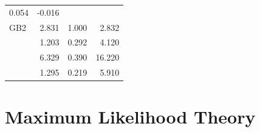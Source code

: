 \documentclass[]{book}
\begin{document}
\begin{longtable}[]{@{}lrrr@{}}
\begin{minipage}[t]{0.24\columnwidth}
0.054\strut
\end{minipage} & \begin{minipage}[t]{0.24\columnwidth}\raggedleft\strut
-0.016\strut
\end{minipage}\tabularnewline
GB2 & 2.831 & 1.000 & 2.832\tabularnewline
\begin{minipage}[t]{0.24\columnwidth}\raggedright\strut
\strut
\end{minipage} & \begin{minipage}[t]{0.24\columnwidth}\raggedleft\strut
1.203\strut
\end{minipage} & \begin{minipage}[t]{0.24\columnwidth}\raggedleft\strut
0.292\strut
\end{minipage} & \begin{minipage}[t]{0.24\columnwidth}\raggedleft\strut
4.120\strut
\end{minipage}\tabularnewline
\begin{minipage}[t]{0.24\columnwidth}\raggedright\strut
\strut
\end{minipage} & \begin{minipage}[t]{0.24\columnwidth}\raggedleft\strut
6.329\strut
\end{minipage} & \begin{minipage}[t]{0.24\columnwidth}\raggedleft\strut
0.390\strut
\end{minipage} & \begin{minipage}[t]{0.24\columnwidth}\raggedleft\strut
16.220\strut
\end{minipage}\tabularnewline
\begin{minipage}[t]{0.24\columnwidth}\raggedright\strut
\strut
\end{minipage} & \begin{minipage}[t]{0.24\columnwidth}\raggedleft\strut
1.295\strut
\end{minipage} & \begin{minipage}[t]{0.24\columnwidth}\raggedleft\strut
0.219\strut
\end{minipage} & \begin{minipage}[t]{0.24\columnwidth}\raggedleft\strut
5.910\strut
\end{minipage}\tabularnewline
\bottomrule
\end{longtable}

\section{Maximum Likelihood Theory}\label{maximum-likelihood-theory}
\end{document}
